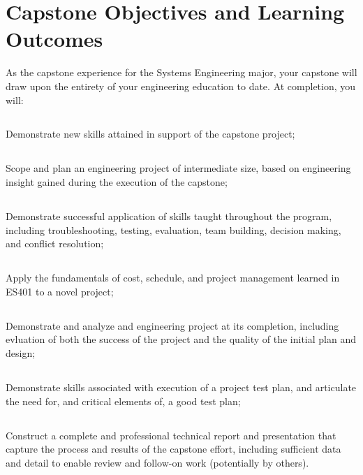 \documentclass[10pt,courier]{navymemo}
\begin{document}
\section{Capstone Objectives and Learning Outcomes}  As the capstone experience for the Systems Engineering major, your capstone will draw upon the entirety of your engineering education to date.  At completion, you will:
\subsection{} Demonstrate new skills attained in support of the capstone project;
\subsection{} Scope and plan an engineering project of intermediate size, based on engineering insight gained during the execution of the capstone;
\subsection{} Demonstrate successful application of skills taught throughout the program, including troubleshooting, testing, evaluation, team building, decision making, and conflict resolution;
\subsection{} Apply the fundamentals of cost, schedule, and project management learned in ES401 to a novel project;
\subsection{} Demonstrate and analyze and engineering project at its completion, including evluation of both the success of the project and the quality of the initial plan and design;
\subsection{} Demonstrate skills associated with execution of a project test plan, and articulate the need for, and critical elements of, a good test plan;
\subsection{} Construct a complete and professional technical report and presentation that capture the process and results of the capstone effort, including sufficient data and detail to enable review and follow-on work (potentially by others).
\end{document}

